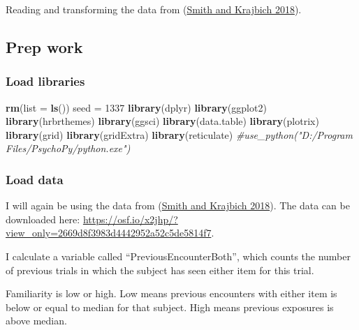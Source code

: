 \documentclass[
]{book}
\newenvironment{Shaded}{\begin{snugshade}}{\end{snugshade}}
\newcommand{\AttributeTok}[1]{\textcolor[rgb]{0.13,0.29,0.53}{#1}}
\newcommand{\CommentTok}[1]{\textcolor[rgb]{0.56,0.35,0.01}{\textit{#1}}}
\newcommand{\DecValTok}[1]{\textcolor[rgb]{0.00,0.00,0.81}{#1}}
\newcommand{\FunctionTok}[1]{\textcolor[rgb]{0.13,0.29,0.53}{\textbf{#1}}}
\newcommand{\NormalTok}[1]{#1}
\newcommand{\OtherTok}[1]{\textcolor[rgb]{0.56,0.35,0.01}{#1}}
\begin{document}
Reading and transforming the data from (\protect\hyperlink{ref-smith2018}{Smith and Krajbich 2018}).

\hypertarget{prep-work-5}{%
\subsection{Prep work}\label{prep-work-5}}

\hypertarget{load-libraries-1}{%
\subsubsection{Load libraries}\label{load-libraries-1}}

\begin{Shaded}
\begin{Highlighting}[]
\FunctionTok{rm}\NormalTok{(}\AttributeTok{list =} \FunctionTok{ls}\NormalTok{())}
\NormalTok{seed }\OtherTok{=} \DecValTok{1337}
\FunctionTok{library}\NormalTok{(dplyr)}
\FunctionTok{library}\NormalTok{(ggplot2)}
\FunctionTok{library}\NormalTok{(hrbrthemes)}
\FunctionTok{library}\NormalTok{(ggsci)}
\FunctionTok{library}\NormalTok{(data.table)}
\FunctionTok{library}\NormalTok{(plotrix)}
\FunctionTok{library}\NormalTok{(grid)}
\FunctionTok{library}\NormalTok{(gridExtra)}
\FunctionTok{library}\NormalTok{(reticulate)}
\CommentTok{\#use\_python("D:/Program Files/PsychoPy/python.exe")}
\end{Highlighting}
\end{Shaded}

\hypertarget{load-data}{%
\subsubsection{Load data}\label{load-data}}

I will again be using the data from (\protect\hyperlink{ref-smith2018}{Smith and Krajbich 2018}). The data can be downloaded here:
\url{https://osf.io/x2jhp/?view_only=2669d8f3983d4442952a52c5de5814f7}.

I calculate a variable called ``PreviousEncounterBoth'', which counts the number of previous trials in which the subject has seen either item for this trial.

Familiarity is low or high. Low means previous encounters with either item is below or equal to median for that subject. High means previous exposures is above median.
\end{document}
